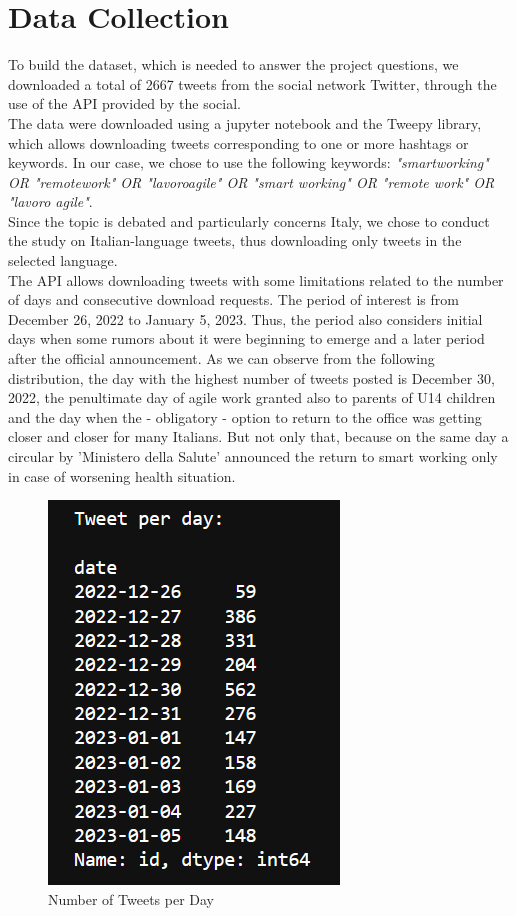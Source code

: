 \documentclass[12pt,journal,compsoc]{IEEEtran}
\begin{document}
\section{Data Collection}
To build the dataset, which is needed to answer the project questions, we downloaded a total of 2667 tweets from the social network Twitter, through the use of the API provided by the social.\\
The data were downloaded using a jupyter notebook and the Tweepy library, which allows downloading tweets corresponding to one or more hashtags or keywords. In our case, we chose to use the following keywords: \textit{"smartworking" OR "remotework" OR "lavoroagile" OR "smart working" OR "remote work" OR "lavoro agile"}.\\
Since the topic is debated and particularly concerns Italy, we chose to conduct the study on Italian-language tweets, thus downloading only tweets in the selected language.\\
The API allows downloading tweets with some limitations related to the number of days and consecutive download requests. The period of interest is from December 26, 2022 to January 5, 2023. Thus, the period also considers initial days when some rumors about it were beginning to emerge and a later period after the official announcement. As we can observe from the following distribution, the day with the highest number of tweets posted is December 30, 2022, the penultimate day of agile work granted also to parents of U14 children and the day when the - obligatory - option to return to the office was getting closer and closer for many Italians. But not only that, because on the same day a circular by 'Ministero della Salute' announced the return to smart working only in case of worsening health situation.

\begin{figure}[H]
  \begin{center}
  \includegraphics[scale=1]{./images/tweetxday.png}
  \end{center}
  \caption{Number of Tweets per Day}
\end{figure}
\end{document}
